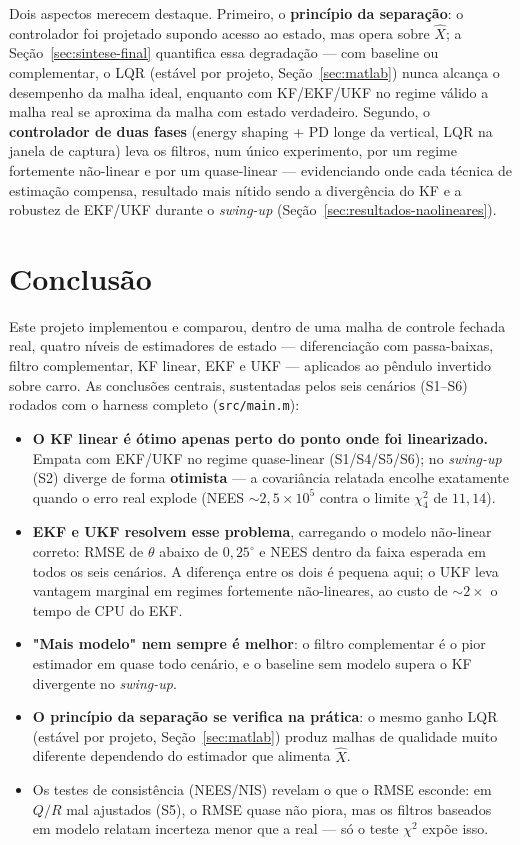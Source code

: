 \documentclass[brazil, 12pt]{article}
\begin{document}
Dois aspectos merecem destaque. Primeiro, o \textbf{princípio da separação}:
o controlador foi projetado supondo acesso ao estado, mas opera sobre
$\hat{X}$; a Seção~\ref{sec:sintese-final} quantifica essa degradação — com
baseline ou complementar, o LQR (estável por projeto,
Seção~\ref{sec:matlab}) nunca alcança o desempenho da malha ideal, enquanto
com KF/EKF/UKF no regime válido a malha real se aproxima da malha com estado
verdadeiro. Segundo, o \textbf{controlador de duas fases} (energy shaping +
PD longe da vertical, LQR na janela de captura) leva os filtros, num único
experimento, por um regime fortemente não-linear e por um quase-linear —
evidenciando onde cada técnica de estimação compensa, resultado mais nítido
sendo a divergência do KF e a robustez de EKF/UKF durante o \emph{swing-up}
(Seção~\ref{sec:resultados-naolineares}).

\section*{Conclusão}

Este projeto implementou e comparou, dentro de uma malha de controle fechada
real, quatro níveis de estimadores de estado — diferenciação com passa-baixas,
filtro complementar, KF linear, EKF e UKF — aplicados ao pêndulo invertido
sobre carro. As conclusões centrais, sustentadas pelos seis cenários (S1--S6)
rodados com o harness completo (\texttt{src/main.m}):

\begin{itemize}
  \item \textbf{O KF linear é ótimo apenas perto do ponto onde foi
  linearizado.} Empata com EKF/UKF no regime quase-linear (S1/S4/S5/S6); no
  \emph{swing-up} (S2) diverge de forma \textbf{otimista} — a covariância
  relatada encolhe exatamente quando o erro real explode (NEES
  $\sim\!2{,}5\times10^{5}$ contra o limite $\chi^2_4$ de $11{,}14$).
  \item \textbf{EKF e UKF resolvem esse problema}, carregando o modelo
  não-linear correto: RMSE de $\theta$ abaixo de $0{,}25^{\circ}$ e NEES
  dentro da faixa esperada em todos os seis cenários. A diferença entre os
  dois é pequena aqui; o UKF leva vantagem marginal em regimes fortemente
  não-lineares, ao custo de ${\sim}2\times$ o tempo de CPU do EKF.
  \item \textbf{"Mais modelo" nem sempre é melhor}: o filtro complementar é o
  pior estimador em quase todo cenário, e o baseline sem modelo supera o KF
  divergente no \emph{swing-up}.
  \item \textbf{O princípio da separação se verifica na prática}: o mesmo
  ganho LQR (estável por projeto, Seção~\ref{sec:matlab}) produz malhas de
  qualidade muito diferente dependendo do estimador que alimenta $\hat X$.
  \item Os testes de consistência (NEES/NIS) revelam o que o RMSE esconde: em
  $Q/R$ mal ajustados (S5), o RMSE quase não piora, mas os filtros baseados
  em modelo relatam incerteza menor que a real — só o teste $\chi^2$ expõe
  isso.
\end{itemize}
\end{document}
